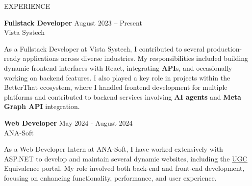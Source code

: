 \documentclass{resume} %
\begin{document}
\begin{rSection}{EXPERIENCE}

\textbf{Fullstack Developer} \hfill August 2023 – Present\\
Vista Systech

As a Fullstack Developer at Vista Systech, I contributed to several production-ready applications across diverse industries. My responsibilities included building dynamic frontend interfaces with React, integrating \textbf{API}s, and occasionally working on backend features. I also played a key role in projects within the BetterThat ecosystem, where I handled frontend development for multiple platforms and contributed to backend services involving \textbf{AI agents} and \textbf{Meta Graph API} integration.




 
     


 
\textbf{Web Developer} \hfill May 2024 - August 2024\\
ANA-Soft 

As a Web Developer Intern at ANA-Soft, I have worked extensively with ASP.NET to develop and maintain several dynamic websites, including the \href{https://ugc-equivalence.website-link.info/Login.aspx}{UGC} Equivalence portal. My role involved both back-end and front-end development, focusing on enhancing functionality, performance, and user experience. 

\end{rSection} 

\end{document}
